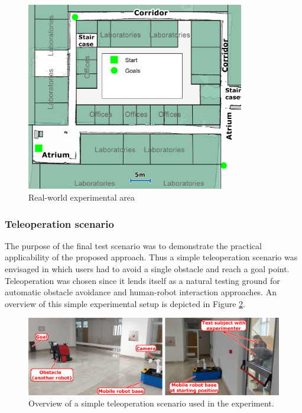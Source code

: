 \begin{figure}
    \centering
    \includegraphics[width=0.85\textwidth]{slike/mapa.png}
    \caption{Real-world experimental area}
    \label{fig:FESB4kat}
\end{figure}

\subsubsection{Teleoperation scenario}
\label{sec:MediationApp}

The purpose of the final test scenario was to demonstrate the practical applicability of the proposed approach. Thus a simple teleoperation scenario was envisaged in which users had to avoid a single obstacle and reach a goal point. Teleoperation was chosen since it lends itself as a natural testing ground for automatic obstacle avoidance and human-robot interaction approaches. An overview of this simple experimental setup is depicted in Figure \ref{Fig:tele2Course}.

\begin{figure}
\centering
\includegraphics[width=1\columnwidth]{slike/teleop.png}
\caption{Overview of a simple teleoperation scenario used in the experiment.}
\label{Fig:tele2Course}
\end{figure}

